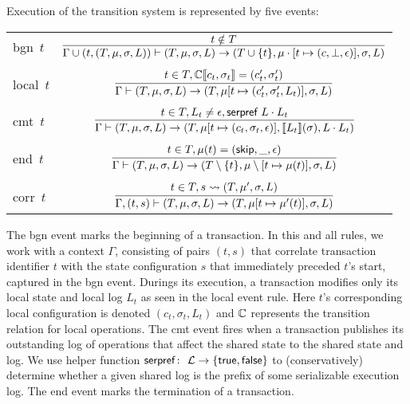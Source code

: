 %
Execution of the transition system is represented by five events:
\begin{center}
\begin{tabular}{lc}
{\sf bgn}\ $t$ & $\infer{\Gamma\cup(t,(T,\mu,\sigma,L))\vdash(T, \mu, \sigma, L) \rightarrow (T \cup \{ t \}, \mu \cdot [t \mapsto (c,\bot,\epsilon)], \sigma, L)}{t \notin T}$ \\
\\
{\sf local}\ $t$ & $\infer{\Gamma\vdash(T, \mu, \sigma, L) \rightarrow (T,\mu[t \mapsto (c'_t,\sigma'_t,L_t)], \sigma, L)}
{t \in T, \csemantics{C}{c_t, \sigma_t} = (c'_t, \sigma'_t)}$\\
\\
{\sf cmt}\ $t$ & $\infer{\Gamma\vdash(T, \mu, \sigma, L) \rightarrow (T, \mu[t \mapsto (c_t,\sigma_t,\epsilon)], \llbracket L_t \rrbracket(\sigma), L \cdot L_t)}{t \in T, L_t \neq \epsilon, {\textnormal{\sf serpref}\ L \cdot L_t}}$ \\
\\
{\sf end}\ $t$ & $\infer{\Gamma\vdash(T, \mu, \sigma, L) \rightarrow (T \setminus \{ t \}, \mu \setminus [t \mapsto \mu(t)], \sigma, L)}{t \in T, \mu(t) = ({\sf skip}, \_, \epsilon)}$ \\
\\
{\sf corr}\ $t$ & $\infer{\Gamma,(t,s)\vdash(T, \mu, \sigma, L) \rightarrow (T,\mu[t \mapsto \mu'(t)], \sigma, L)}{
	t \in T, 
	s \leadsto (T,\mu', \sigma, L)}$\\
\end{tabular}
\end{center}
%
The {\sf bgn} event marks the beginning of a transaction.
In this and all rules, we work with a context $\Gamma$, consisting of pairs $(t,s)$ that correlate
transaction identifier $t$ with the state configuration $s$
that immediately preceded $t$'s start, captured in the {\sf bgn} event.
%
Durings its execution, a transaction modifies only its local state and local log $L_t$ as seen in the {\sf local} event rule.
Here $t$'s corresponding local configuration is denoted $(c_t,\sigma_t,L_t)$
and $\mathbb{C}$ represents the transition relation for local operations.
%
The {\sf cmt} event fires when a transaction publishes its outstanding
log of operations that affect the shared state to the shared state and
log.  We use helper function ${\sf serpref} \colon\ {\cal L}
\rightarrow \{ {\sf true},{\sf false} \}$ to (conservatively)
determine whether a given shared log is the prefix of some
serializable execution log.
%
The {\sf end} event marks the termination of a transaction.

